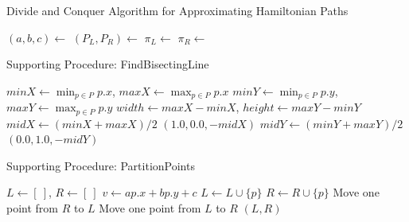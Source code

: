\documentclass[11pt]{beamer}
\begin{document}
\begin{frame}{Divide and Conquer Algorithm for Approximating Hamiltonian Paths}
	\begin{algorithm}[H]
		\caption{DivideAndConquerWiener($P$)}
		\begin{algorithmic}[1]
			\State \Return {}
			\EndIf
			\State $(a, b, c) \gets$ 
			\State $(P_L, P_R) \gets$ 
			\State $\pi_L \gets$ 
			\State $\pi_R \gets$ 
			\State \Return {}
			\EndProcedure
		\end{algorithmic}
	\end{algorithm}
\end{frame}

\begin{frame}{Supporting Procedure: FindBisectingLine}
	\begin{algorithm}[H]
		\caption{FindBisectingLine($P$)}
		\begin{algorithmic}[1]
			\State $minX \gets \min_{p \in P} p.x$, $maxX \gets \max_{p \in P} p.x$
			\State $minY \gets \min_{p \in P} p.y$, $maxY \gets \max_{p \in P} p.y$
			\State $width \gets maxX - minX$, $height \gets maxY - minY$
			\State $midX \gets (minX + maxX)/2$
			\State \Return $(1.0, 0.0, -midX)$ 
			\Else
			\State $midY \gets (minY + maxY)/2$
			\State \Return $(0.0, 1.0, -midY)$ 
			\EndIf
			\EndProcedure
		\end{algorithmic}
	\end{algorithm}
\end{frame}

\begin{frame}{Supporting Procedure: PartitionPoints}
	\begin{algorithm}[H]
		\caption{PartitionPoints($P$, $a$, $b$, $c$)}
		\begin{algorithmic}[1]
			\State $L \gets [\ ]$, $R \gets [\ ]$
			\State $v \gets ap.x + bp.y + c$
			\State $L \gets L \cup \{p\}$
			\Else
			\State $R \gets R \cup \{p\}$
			\EndIf
			\EndFor
			\State Move one point from $R$ to $L$
			\State Move one point from $L$ to $R$
			\EndIf
			\State \Return $(L, R)$
			\EndProcedure
		\end{algorithmic}
	\end{algorithm}
\end{frame}
\end{document}
